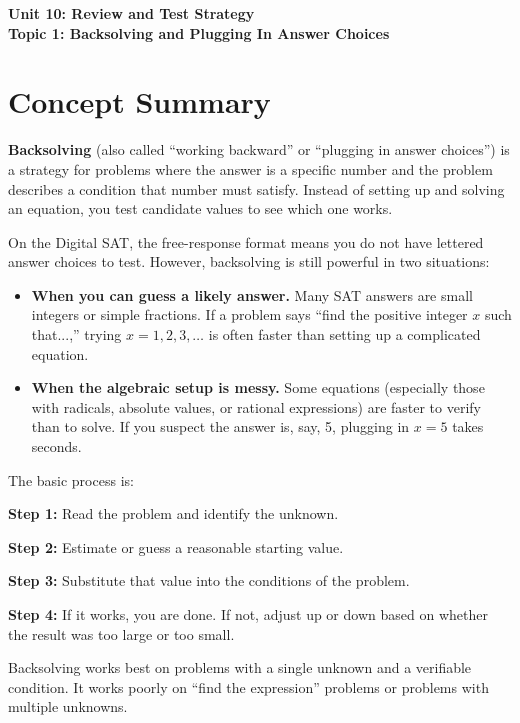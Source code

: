 \documentclass[14pt]{extarticle}
\begin{document}
\raggedright
{}

\begin{center}
    \LARGE \textbf{Unit 10: Review and Test Strategy} \\[6pt]
    \Large \textbf{Topic 1: Backsolving and Plugging In Answer Choices}
\end{center}

\vspace{1em}

\section*{Concept Summary}

\textbf{Backsolving} (also called ``working backward'' or ``plugging in answer choices'') is a strategy for problems where the answer is a specific number and the problem describes a condition that number must satisfy. Instead of setting up and solving an equation, you test candidate values to see which one works.

On the Digital SAT, the free-response format means you do not have lettered answer choices to test. However, backsolving is still powerful in two situations:

\begin{itemize}
  \item \textbf{When you can guess a likely answer.} Many SAT answers are small integers or simple fractions. If a problem says ``find the positive integer \(x\) such that...,'' trying \(x = 1, 2, 3, \ldots\) is often faster than setting up a complicated equation.
  \item \textbf{When the algebraic setup is messy.} Some equations (especially those with radicals, absolute values, or rational expressions) are faster to verify than to solve. If you suspect the answer is, say, 5, plugging in \(x = 5\) takes seconds.
\end{itemize}

The basic process is:

\textbf{Step 1:} Read the problem and identify the unknown.

\textbf{Step 2:} Estimate or guess a reasonable starting value.

\textbf{Step 3:} Substitute that value into the conditions of the problem.

\textbf{Step 4:} If it works, you are done. If not, adjust up or down based on whether the result was too large or too small.

Backsolving works best on problems with a single unknown and a verifiable condition. It works poorly on ``find the expression'' problems or problems with multiple unknowns.
\end{document}
